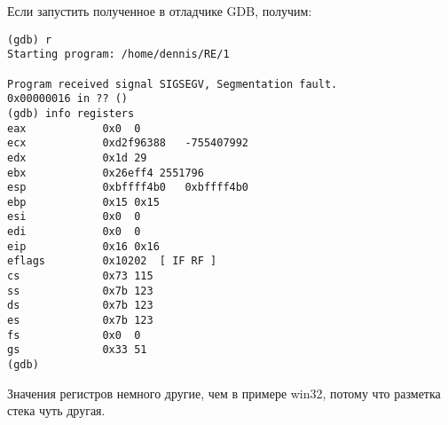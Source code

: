 Если запустить полученное в отладчике GDB, получим:

\begin{lstlisting}
(gdb) r
Starting program: /home/dennis/RE/1 

Program received signal SIGSEGV, Segmentation fault.
0x00000016 in ?? ()
(gdb) info registers
eax            0x0	0
ecx            0xd2f96388	-755407992
edx            0x1d	29
ebx            0x26eff4	2551796
esp            0xbffff4b0	0xbffff4b0
ebp            0x15	0x15
esi            0x0	0
edi            0x0	0
eip            0x16	0x16
eflags         0x10202	[ IF RF ]
cs             0x73	115
ss             0x7b	123
ds             0x7b	123
es             0x7b	123
fs             0x0	0
gs             0x33	51
(gdb) 
\end{lstlisting}

Значения регистров немного другие, чем в примере win32, потому что разметка стека чуть другая.

